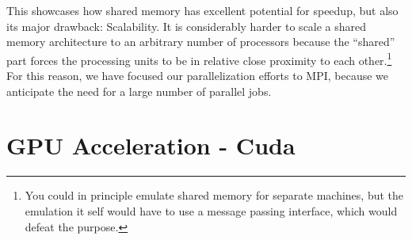 \documentclass[Thesis.tex]{subfiles}
\begin{document}
This showcases how shared memory has excellent potential for speedup, but also
its major drawback: Scalability. It is considerably harder to scale a shared
memory architecture to an arbitrary number of processors because the ``shared''
part forces the processing units to be in relative close proximity to each
other.\footnote{You could in principle emulate shared memory for separate
  machines, but the emulation it self would have to use a message passing
  interface, which would defeat the purpose.} For this reason, we have focused
our parallelization efforts to MPI, because we anticipate the need for a large
number of parallel jobs.


\section{GPU Acceleration - Cuda}
\end{document}
